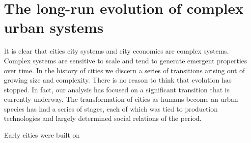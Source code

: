 
\section{The long-run evolution of complex urban systems}

It is clear that cities city systems and city economies are complex systems. Complex systems are sensitive to scale and tend to generate emergent properties over time. In the history of cities we discern a series of transitions arising out of growing size and complexity. There is no reason to  think that evolution has stopped. In fact, our analysis has focused on a significant transition that is currently underway. The transformation of cities as humans become an urban species has had a series of stages, each of which was tied to production technologies and largely determined social relations of the period.

Early cities were built on 
 
